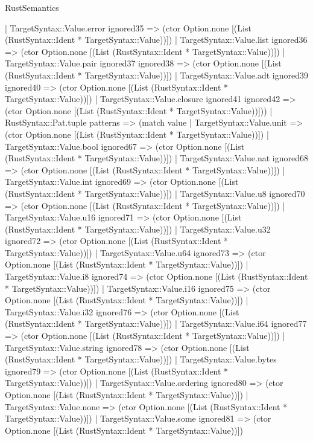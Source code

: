 \begin{lexlean}{RustSemantics}
\begin{semanticmodule}
{      | TargetSyntax::Value.error ignored35 => (ctor Option.none [(List (RustSyntax::Ident * TargetSyntax::Value))])
      | TargetSyntax::Value.list ignored36 => (ctor Option.none [(List (RustSyntax::Ident * TargetSyntax::Value))])
      | TargetSyntax::Value.pair ignored37 ignored38 => (ctor Option.none [(List (RustSyntax::Ident * TargetSyntax::Value))])
      | TargetSyntax::Value.adt ignored39 ignored40 => (ctor Option.none [(List (RustSyntax::Ident * TargetSyntax::Value))])
      | TargetSyntax::Value.closure ignored41 ignored42 => (ctor Option.none [(List (RustSyntax::Ident * TargetSyntax::Value))]))
    | RustSyntax::Pat.tuple patterns => (match value
      | TargetSyntax::Value.unit => (ctor Option.none [(List (RustSyntax::Ident * TargetSyntax::Value))])
      | TargetSyntax::Value.bool ignored67 => (ctor Option.none [(List (RustSyntax::Ident * TargetSyntax::Value))])
      | TargetSyntax::Value.nat ignored68 => (ctor Option.none [(List (RustSyntax::Ident * TargetSyntax::Value))])
      | TargetSyntax::Value.int ignored69 => (ctor Option.none [(List (RustSyntax::Ident * TargetSyntax::Value))])
      | TargetSyntax::Value.u8 ignored70 => (ctor Option.none [(List (RustSyntax::Ident * TargetSyntax::Value))])
      | TargetSyntax::Value.u16 ignored71 => (ctor Option.none [(List (RustSyntax::Ident * TargetSyntax::Value))])
      | TargetSyntax::Value.u32 ignored72 => (ctor Option.none [(List (RustSyntax::Ident * TargetSyntax::Value))])
      | TargetSyntax::Value.u64 ignored73 => (ctor Option.none [(List (RustSyntax::Ident * TargetSyntax::Value))])
      | TargetSyntax::Value.i8 ignored74 => (ctor Option.none [(List (RustSyntax::Ident * TargetSyntax::Value))])
      | TargetSyntax::Value.i16 ignored75 => (ctor Option.none [(List (RustSyntax::Ident * TargetSyntax::Value))])
      | TargetSyntax::Value.i32 ignored76 => (ctor Option.none [(List (RustSyntax::Ident * TargetSyntax::Value))])
      | TargetSyntax::Value.i64 ignored77 => (ctor Option.none [(List (RustSyntax::Ident * TargetSyntax::Value))])
      | TargetSyntax::Value.string ignored78 => (ctor Option.none [(List (RustSyntax::Ident * TargetSyntax::Value))])
      | TargetSyntax::Value.bytes ignored79 => (ctor Option.none [(List (RustSyntax::Ident * TargetSyntax::Value))])
      | TargetSyntax::Value.ordering ignored80 => (ctor Option.none [(List (RustSyntax::Ident * TargetSyntax::Value))])
      | TargetSyntax::Value.none => (ctor Option.none [(List (RustSyntax::Ident * TargetSyntax::Value))])
      | TargetSyntax::Value.some ignored81 => (ctor Option.none [(List (RustSyntax::Ident * TargetSyntax::Value))])
}
\end{semanticmodule}
\end{lexlean}
